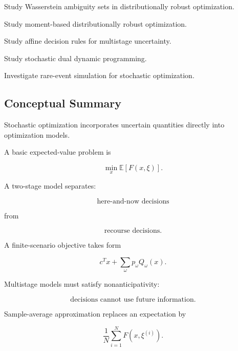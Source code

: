 \begin{exercise}[4]
Study Wasserstein ambiguity sets in distributionally robust optimization.
\end{exercise}

\begin{exercise}[4]
Study moment-based distributionally robust optimization.
\end{exercise}

\begin{exercise}[4]
Study affine decision rules for multistage uncertainty.
\end{exercise}

\begin{exercise}[4]
Study stochastic dual dynamic programming.
\end{exercise}

\begin{exercise}[4]
Investigate rare-event simulation for stochastic optimization.
\end{exercise}

\subsection{Conceptual Summary}
\label{subsec:stochastic-optimization-summary}

Stochastic optimization incorporates uncertain quantities directly into
optimization models.

A basic expected-value problem is

\[
\boxed{
\min_x
\mathbb{E}
[
F(x,\xi)
].
}
\]

A two-stage model separates:

\[
\boxed{
\text{here-and-now decisions}
}
\]

from

\[
\boxed{
\text{recourse decisions}.
}
\]

A finite-scenario objective takes form

\[
\boxed{
c^Tx
+
\sum_{\omega}
p_\omega
Q_\omega(x).
}
\]

Multistage models must satisfy nonanticipativity:

\[
\boxed{
\text{decisions cannot use future information}.
}
\]

Sample-average approximation replaces an expectation by

\[
\boxed{
\frac1N
\sum_{i=1}^{N}
F(x,\xi^{(i)}).
}
\]


